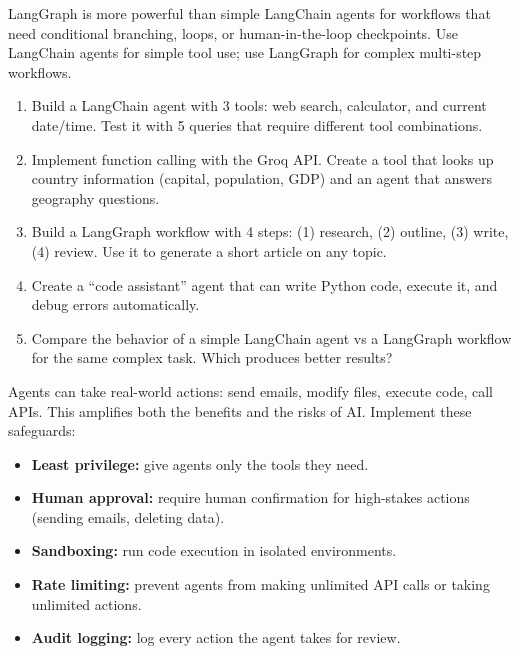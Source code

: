 \begin{aitip}
LangGraph is more powerful than simple LangChain agents for workflows that need conditional branching, loops, or human-in-the-loop checkpoints. Use LangChain agents for simple tool use; use LangGraph for complex multi-step workflows.
\end{aitip}

\begin{exercise}
\begin{enumerate}
  \item Build a LangChain agent with 3 tools: web search, calculator, and current date/time. Test it with 5 queries that require different tool combinations.
  \item Implement function calling with the Groq API. Create a tool that looks up country information (capital, population, GDP) and an agent that answers geography questions.
  \item Build a LangGraph workflow with 4 steps: (1) research, (2) outline, (3) write, (4) review. Use it to generate a short article on any topic.
  \item Create a ``code assistant'' agent that can write Python code, execute it, and debug errors automatically.
  \item Compare the behavior of a simple LangChain agent vs a LangGraph workflow for the same complex task. Which produces better results?
\end{enumerate}
\end{exercise}

\begin{ethicsbox}
Agents can take real-world actions: send emails, modify files, execute code, call APIs. This amplifies both the benefits and the risks of AI. Implement these safeguards:
\begin{itemize}
  \item \textbf{Least privilege:} give agents only the tools they need.
  \item \textbf{Human approval:} require human confirmation for high-stakes actions (sending emails, deleting data).
  \item \textbf{Sandboxing:} run code execution in isolated environments.
  \item \textbf{Rate limiting:} prevent agents from making unlimited API calls or taking unlimited actions.
  \item \textbf{Audit logging:} log every action the agent takes for review.
\end{itemize}
\end{ethicsbox}

